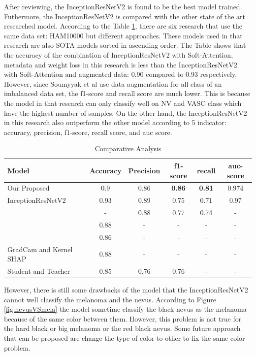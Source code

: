 \documentclass[sensors,article,submit,pdftex,moreauthors]{Definitions/mdpi}
\begin{document}
After reviewing, the InceptionResNetV2 is found to be the best model trained. Futhermore, the InceptionResNetV2 is compared with the other state of the art researched model. According to the Table \ref{table:comparative-analysis}, there are six research that use the same data set: HAM10000 but different approaches. These models used in that research are also SOTA models sorted in ascending order. The Table shows that the accuracy of the combination of InceptionResNetV2 with Soft-Attention, metadata and weight loss in this research is less than the InceptionResNetV2 with Soft-Attention and augmented data: 0.90 compared to 0.93 respectively. However, since Soumyyak et al use data augmentation for all class of an imbalanced data set, the f1-score and recall score are much lower. This is because the model in that research can only classify well on NV and VASC class which have the highest number of samples. On the other hand, the InceptionResNetV2 in this research also outperform the other model according to 5 indicator: accuracy, precision, f1-score, recall score, and auc score. 
\FloatBarrier
\begin{table}[H]
	\centering
	\begin{tabular}{| p{4cm} | c | c | c | c | c |}
		\hline
		Model & Accuracy & Precision & f1-score & recall & auc-score\\
		\hline
		Our Proposed & 0.9	& 0.86 &\textbf{0.86} & \textbf{0.81} & 0.974\\
		\hline
		InceptionResNetV2\cite{03358} & 0.93 & 0.89 & 0.75 & 0.71 & 0.97\\
		\hline
		\cite{03798} & - & 0.88 & 0.77 & 0.74 & - \\
		\hline
		\cite{09418} & 0.88 & - & - & - & - \\
		\hline
		\cite{01284} & 0.86 & - & - & - & - \\
		\hline
		GradCam and Kernel SHAP\cite{06612} & 0.88 & - & - & - & - \\
		\hline
		Student and Teacher\cite{03225} & 0.85 & 0.76 & 0.76 & - & - \\
		\hline
	\end{tabular}
	\caption{Comparative Analysis}
	\label{table:comparative-analysis}
\end{table} 

However, there is still some drawbacks of the model that the InceptionResNetV2 cannot well classify the melanoma and the nevus. According to Figure \ref{fig:nevusVSmela} the model sometime classify the black nevus as the melanoma because of the same color between them. However, this problem is not true for the hard black or big melanoma or the red black nevus. Some future approach that can be proposed are change the type of color to other to fix the same color problem.
\end{document}
